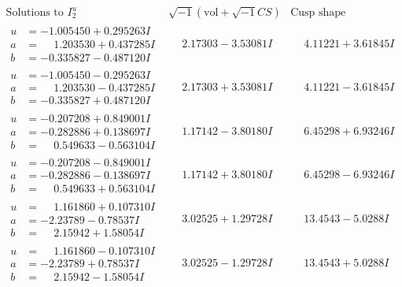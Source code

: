 \documentclass[1p]{elsarticle_modified}
\theoremstyle{definition}
\newcommand{\I}{\sqrt{-1}}
\begin{document}
$$\begin{array}{c|c|c}  
\text{Solutions to }I^u_{2}& \I (\text{vol} + \sqrt{-1}CS) & \text{Cusp shape}\\
 \hline 
\begin{aligned}
u &= -1.005450 + 0.295263 I \\
a &= \phantom{-}1.203530 + 0.437285 I \\
b &= -0.335827 - 0.487120 I\end{aligned}
 & \phantom{-}2.17303 - 3.53081 I & \phantom{-}4.11221 + 3.61845 I \\ \hline\begin{aligned}
u &= -1.005450 - 0.295263 I \\
a &= \phantom{-}1.203530 - 0.437285 I \\
b &= -0.335827 + 0.487120 I\end{aligned}
 & \phantom{-}2.17303 + 3.53081 I & \phantom{-}4.11221 - 3.61845 I \\ \hline\begin{aligned}
u &= -0.207208 + 0.849001 I \\
a &= -0.282886 + 0.138697 I \\
b &= \phantom{-}0.549633 - 0.563104 I\end{aligned}
 & \phantom{-}1.17142 - 3.80180 I & \phantom{-}6.45298 + 6.93246 I \\ \hline\begin{aligned}
u &= -0.207208 - 0.849001 I \\
a &= -0.282886 - 0.138697 I \\
b &= \phantom{-}0.549633 + 0.563104 I\end{aligned}
 & \phantom{-}1.17142 + 3.80180 I & \phantom{-}6.45298 - 6.93246 I \\ \hline\begin{aligned}
u &= \phantom{-}1.161860 + 0.107310 I \\
a &= -2.23789 - 0.78537 I \\
b &= \phantom{-}2.15942 + 1.58054 I\end{aligned}
 & \phantom{-}3.02525 + 1.29728 I & \phantom{-}13.4543 - 5.0288 I \\ \hline\begin{aligned}
u &= \phantom{-}1.161860 - 0.107310 I \\
a &= -2.23789 + 0.78537 I \\
b &= \phantom{-}2.15942 - 1.58054 I\end{aligned}
 & \phantom{-}3.02525 - 1.29728 I & \phantom{-}13.4543 + 5.0288 I \\ \hline\begin{aligned}

\end{aligned}
\end{array}$$
\end{document}
